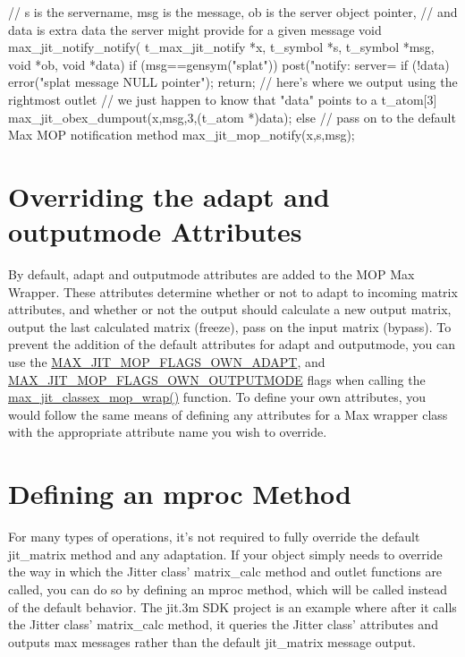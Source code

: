 \begin{DoxyCode}
// s is the servername, msg is the message, ob is the server object pointer, 
// and data is extra data the server might provide for a given message
void max_jit_notify_notify(
   t_max_jit_notify *x, t_symbol *s, t_symbol *msg, void *ob, void *data)
{
   if (msg==gensym("splat")) {
      post("notify: server=%
      if (!data) {
         error("splat message NULL pointer");
         return;
      }
      // here's where we output using the rightmost outlet
      // we just happen to know that "data" points to a t_atom[3]
      max_jit_obex_dumpout(x,msg,3,(t_atom *)data); 
   } else {
      // pass on to the default Max MOP notification method 
      max_jit_mop_notify(x,s,msg);
   }
}
\end{DoxyCode}
\hypertarget{chapter_jit_mopdetails_chapter_jit_mopdetails_overrideadapt}{}\section{Overriding the adapt and outputmode Attributes}\label{chapter_jit_mopdetails_chapter_jit_mopdetails_overrideadapt}
By default, adapt and outputmode attributes are added to the MOP Max Wrapper. These attributes determine whether or not to adapt to incoming matrix attributes, and whether or not the output should calculate a new output matrix, output the last calculated matrix (freeze), pass on the input matrix (bypass). To prevent the addition of the default attributes for adapt and outputmode, you can use the \hyperlink{group__jitter_ga1c01c9fbad6e41293920117964654f61}{MAX\_\-JIT\_\-MOP\_\-FLAGS\_\-OWN\_\-ADAPT}, and \hyperlink{group__jitter_gadad1691bc68342a60441cb884a89129d}{MAX\_\-JIT\_\-MOP\_\-FLAGS\_\-OWN\_\-OUTPUTMODE} flags when calling the \hyperlink{group__maxmopmod_ga7e08584771f58ce1fe0b190d27b5759b}{max\_\-jit\_\-classex\_\-mop\_\-wrap()} function. To define your own attributes, you would follow the same means of defining any attributes for a Max wrapper class with the appropriate attribute name you wish to override.\hypertarget{chapter_jit_mopdetails_chapter_jit_mopdetails_mproc}{}\section{Defining an mproc Method}\label{chapter_jit_mopdetails_chapter_jit_mopdetails_mproc}
For many types of operations, it's not required to fully override the default jit\_\-matrix method and any adaptation. If your object simply needs to override the way in which the Jitter class' matrix\_\-calc method and outlet functions are called, you can do so by defining an mproc method, which will be called instead of the default behavior. The jit.3m SDK project is an example where after it calls the Jitter class' matrix\_\-calc method, it queries the Jitter class' attributes and outputs max messages rather than the default jit\_\-matrix message output.


